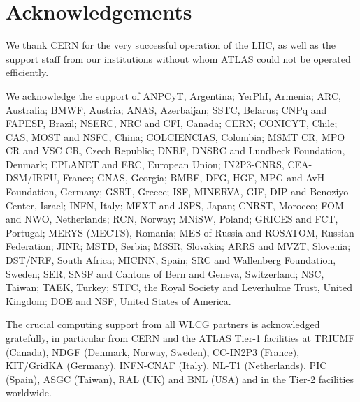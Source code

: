 \documentclass[11pt,a4paper,dvips]{article}
\begin{document}

\section{Acknowledgements}

We thank CERN for the very successful operation of the LHC, as well as the
support staff from our institutions without whom ATLAS could not be
operated efficiently.

We acknowledge the support of ANPCyT, Argentina; YerPhI, Armenia; ARC,
Australia; BMWF, Austria; ANAS, Azerbaijan; SSTC, Belarus; CNPq and FAPESP,
Brazil; NSERC, NRC and CFI, Canada; CERN; CONICYT, Chile; CAS, MOST and NSFC,
China; COLCIENCIAS, Colombia; MSMT CR, MPO CR and VSC CR, Czech Republic;
DNRF, DNSRC and Lundbeck Foundation, Denmark; EPLANET and ERC, European Union;
IN2P3-CNRS, CEA-DSM/IRFU, France; GNAS, Georgia; BMBF, DFG, HGF, MPG and AvH
Foundation, Germany; GSRT, Greece; ISF, MINERVA, GIF, DIP and Benoziyo Center,
Israel; INFN, Italy; MEXT and JSPS, Japan; CNRST, Morocco; FOM and NWO,
Netherlands; RCN, Norway; MNiSW, Poland; GRICES and FCT, Portugal; MERYS
(MECTS), Romania; MES of Russia and ROSATOM, Russian Federation; JINR; MSTD,
Serbia; MSSR, Slovakia; ARRS and MVZT, Slovenia; DST/NRF, South Africa;
MICINN, Spain; SRC and Wallenberg Foundation, Sweden; SER, SNSF and Cantons of
Bern and Geneva, Switzerland; NSC, Taiwan; TAEK, Turkey; STFC, the Royal
Society and Leverhulme Trust, United Kingdom; DOE and NSF, United States of
America.

The crucial computing support from all WLCG partners is acknowledged
gratefully, in particular from CERN and the ATLAS Tier-1 facilities at
TRIUMF (Canada), NDGF (Denmark, Norway, Sweden), CC-IN2P3 (France),
KIT/GridKA (Germany), INFN-CNAF (Italy), NL-T1 (Netherlands), PIC (Spain),
ASGC (Taiwan), RAL (UK) and BNL (USA) and in the Tier-2 facilities
worldwide.
\end{document}
